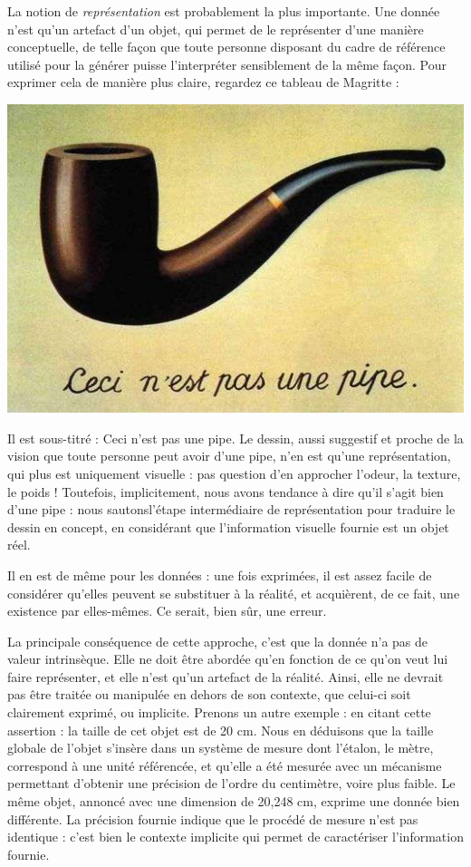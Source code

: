 \documentclass[10pt,a4paper,titlepage]{article}
\begin{document}
La notion de \textit{représentation} est probablement la plus importante. Une donnée n'est qu'un artefact d'un objet, qui permet de le représenter d'une manière conceptuelle, de telle façon que toute personne disposant du cadre de référence utilisé pour la générer puisse l'interpréter sensiblement de la même façon. 
Pour exprimer cela de manière plus claire, regardez ce tableau de Magritte :
\begin{center}
\includegraphics{image/pipe}
\end{center}
Il est sous-titré : \og Ceci n'est pas une pipe\fg. Le dessin, aussi suggestif et proche de la vision que toute personne peut avoir d'une pipe, n'en est qu'une représentation, qui plus est uniquement visuelle : pas question d'en approcher l'odeur, la texture, le poids ! Toutefois, implicitement, nous avons tendance à dire qu'il s'agit bien d'une pipe : nous \og sautons\fg l'étape intermédiaire de représentation pour traduire le dessin en concept, en considérant que l'information visuelle fournie est un objet réel.

Il en est de même pour les données : une fois exprimées, il est assez facile de considérer qu'elles peuvent se substituer à la réalité, et acquièrent, de ce fait, une existence par elles-mêmes. Ce serait, bien sûr, une erreur.

La principale conséquence de cette approche, c'est que la donnée n'a pas de valeur intrinsèque. Elle ne doit être abordée qu'en fonction de ce qu'on veut lui faire représenter, et elle n'est qu'un artefact de la réalité.
Ainsi, elle ne devrait pas être traitée ou manipulée en dehors de son contexte, que celui-ci soit clairement exprimé, ou implicite. 
Prenons un autre exemple : en citant cette assertion : \og la taille de cet objet est de 20 cm\fg. Nous en déduisons que la taille globale de l'objet s'insère dans un système de mesure dont l'étalon, le mètre, correspond à une unité référencée, et qu'elle a été mesurée avec un mécanisme permettant d'obtenir une précision de l'ordre du centimètre, voire plus faible. Le même objet, annoncé avec une dimension de 20,248 cm, exprime une donnée bien différente. La précision fournie indique que le procédé de mesure n'est pas identique : c'est bien le contexte implicite qui permet de caractériser l'information fournie.




\end{document}
